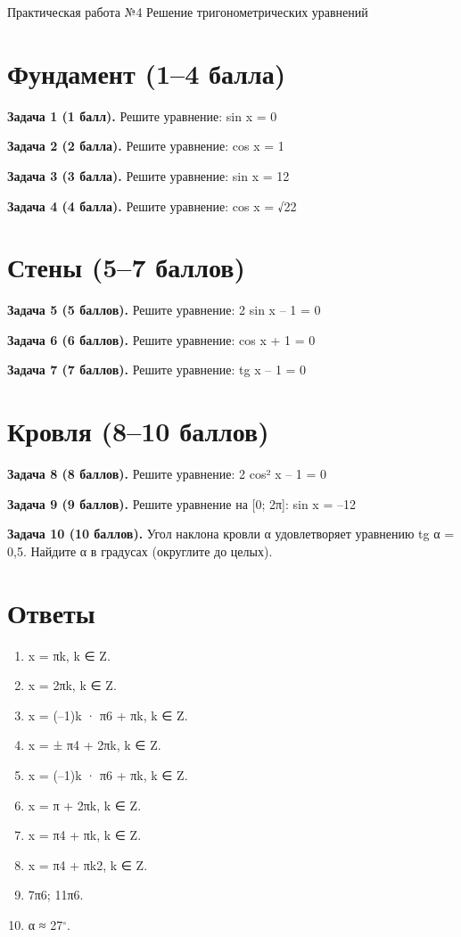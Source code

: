 \documentclass{umk-matematika}
\begin{document}
\maketitlepage
    {Практическая работа №4}
    {Решение тригонометрических уравнений}
    {}

\section{Фундамент (1--4 балла)}

\textbf{Задача 1 (1 балл).} Решите уравнение: sin x = 0

\textbf{Задача 2 (2 балла).} Решите уравнение: cos x = 1

\textbf{Задача 3 (3 балла).} Решите уравнение: sin x = 12

\textbf{Задача 4 (4 балла).} Решите уравнение: cos x = √22

\section{Стены (5--7 баллов)}

\textbf{Задача 5 (5 баллов).} Решите уравнение: 2 sin x – 1 = 0

\textbf{Задача 6 (6 баллов).} Решите уравнение: cos x + 1 = 0

\textbf{Задача 7 (7 баллов).} Решите уравнение: tg x – 1 = 0

\section{Кровля (8--10 баллов)}

\textbf{Задача 8 (8 баллов).} Решите уравнение: 2 cos² x – 1 = 0

\textbf{Задача 9 (9 баллов).} Решите уравнение на [0; 2π]: sin x = –12

\textbf{Задача 10 (10 баллов).} Угол наклона кровли α удовлетворяет уравнению tg α = 0,5. Найдите α в градусах (округлите до целых).

\newpage
\section*{Ответы}

\begin{enumerate}
  \item x = πk, k ∈ Z.
  \item x = 2πk, k ∈ Z.
  \item x = (–1)k · π6 + πk, k ∈ Z.
  \item x = ± π4 + 2πk, k ∈ Z.
  \item x = (–1)k · π6 + πk, k ∈ Z.
  \item x = π + 2πk, k ∈ Z.
  \item x = π4 + πk, k ∈ Z.
  \item x = π4 + πk2, k ∈ Z.
  \item 7π6; 11π6.
  \item α ≈ 27$^\circ$.
\end{enumerate}
\end{document}
